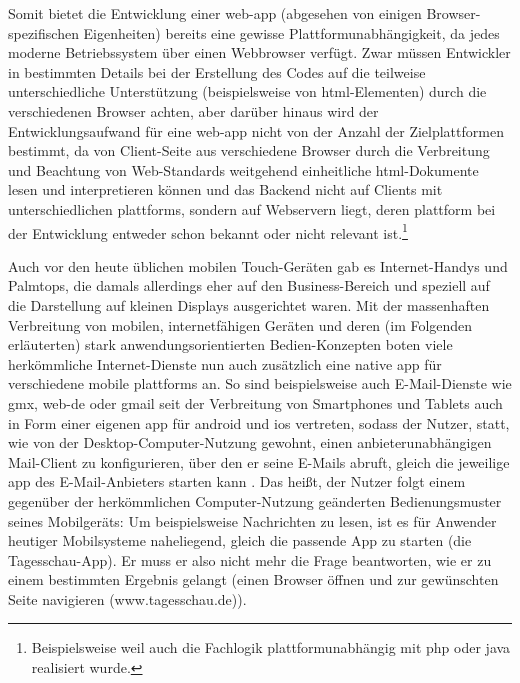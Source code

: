 Somit bietet die Entwicklung einer \gls{web-app} (abgesehen von einigen Browser-spezifischen Eigenheiten) bereits eine gewisse Plattformunabhängigkeit, da jedes moderne Betriebssystem über einen Webbrowser verfügt. 
Zwar müssen Entwickler in bestimmten Details bei der Erstellung des Codes auf die teilweise unterschiedliche Unterstützung (beispielsweise von \gls{html}-Elementen) durch die verschiedenen Browser achten, aber darüber hinaus wird der Entwicklungsaufwand für eine \gls{web-app} nicht von der Anzahl der Zielplattformen bestimmt, da von Client-Seite aus verschiedene Browser durch die Verbreitung und Beachtung von Web-Standards weitgehend einheitliche \gls{html}-Dokumente lesen und interpretieren können und das Back\-end nicht auf Clients mit unterschiedlichen \glspl{plattform}, sondern auf Webservern liegt, deren \gls{plattform} bei der Entwicklung entweder schon bekannt oder nicht relevant ist.\footnote{Beispielsweise weil auch die Fachlogik plattformunabhängig mit \gls*{php} oder \gls*{java} realisiert wurde.}

Auch vor den heute üblichen mobilen Touch-Geräten gab es Internet-Handys und Palmtops, die damals allerdings eher auf den Business-Bereich und speziell auf die Darstellung auf kleinen Displays ausgerichtet waren.
Mit der massenhaften Verbreitung von mobilen, internetfähigen Geräten und deren (im Folgenden erläuterten) stark anwendungsorientierten Bedien-Konzepten boten viele herkömmliche Internet-Dienste nun auch zusätzlich eine native \gls{app} für verschiedene mobile \glspl{plattform} an.
So sind beispielsweise auch E-Mail-Dienste wie \gls{gmx}, \gls{web-de} oder \gls{gmail} seit der Verbreitung von Smartphones und Tablets auch in Form einer eigenen \gls{app} für \gls{android} und \gls{ios} vertreten, sodass der Nutzer, statt, wie von der Desktop-Computer-Nutzung gewohnt, einen anbieterunabhängigen Mail-Client zu konfigurieren, über den er seine E-Mails abruft, gleich die jeweilige \gls{app} des E-Mail-Anbieters starten kann \cite{gmx, web.de, gmail}.
Das heißt, der Nutzer folgt einem gegenüber der herkömmlichen Computer-Nutzung geänderten Bedienungsmuster seines Mobilgeräts: 
Um beispielsweise Nachrichten zu lesen, ist es für Anwender heutiger Mobilsysteme naheliegend,
gleich die passende App zu starten (\zB die Tagesschau-App). 
Er muss er also nicht mehr die Frage beantworten, wie er zu einem bestimmten Ergebnis gelangt (einen Browser öffnen und zur gewünschten Seite navigieren (www.tagesschau.de)).

